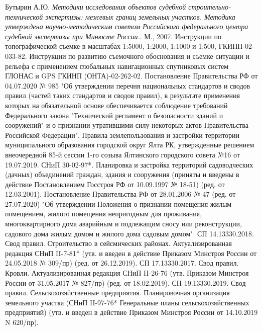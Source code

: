 \begin{thebibliography}{99}
Бутырин А.Ю. \textit{Методики исследования объектов судебной строительно-технической экспертизы: межевых границ земельных участков. Методика утверждена научно-методическим советом Российского федерального центра судебной экспертизы при Минюсте России.}. М., 2007.    
Инструкции по топографической съемке в масштабах 1:5000, 1:2000, 1:1000 и 1:500, ГКИНП-02-033-82.  
Инструкции по развитию съемочного обоснования и съемке ситуации и рельефа с применением глобальных навигационных спутниковых систем ГЛОНАС и GPS ГКИНП (ОНТА)-02-262-02.  
Постановление Правительства РФ от 04.07.2020 № 985 "Об утверждении перечня национальных стандартов и сводов правил (частей таких стандартов и сводов правил), в результате применения которых на обязательной основе обеспечивается соблюдение требований Федерального закона "Технический регламент о безопасности зданий и сооружений" и о признании утратившими силу некоторых актов Правительства Российской Федерации".  
Правила землепользования и застройки территории муниципального образования городской округ Ялта РК, утвержденные решением внеочередной 85-й сессии 1-го созыва Ялтинского городского совета №16 от 19.07.2019.  
СНиП 30-02-97*. Планировка и застройка территорий садоводческих (дачных) объединений граждан, здания и сооружения (приняты и введены в действие Постановлением Госстроя РФ от 10.09.1997 № 18-51) (ред. от 12.03.2001).  
Постановление Правительства РФ от 28.01.2006 № 47 (ред. от 27.07.2020) "Об утверждении Положения о признании помещения жилым помещением, жилого помещения непригодным для проживания, многоквартирного дома аварийным и подлежащим сносу или реконструкции, садового дома жилым домом и жилого дома садовым домом".  
СП 14.13330.2018. Свод правил. Строительство в сейсмических районах. Актуализированная редакция СНиП II-7-81* (утв. и введен в действие Приказом Минстроя России от 24.05.2018 № 309/пр) (ред. от 26.12.2019).  
СП 17.13330.2017. Свод правил. Кровли. Актуализированная редакция СНиП II-26-76 (утв. Приказом Минстроя России от 31.05.2017 № 827/пр) (ред. от 18.02.2019).  
СП 19.13330.2019. Свод правил. Сельскохозяйственные предприятия. Планировочная организация земельного участка (СНиП II-97-76* Генеральные планы сельскохозяйственных предприятий) (утв. и введен в действие Приказом Минстроя России от 14.10.2019 N 620/пр).  

\end{thebibliography}
